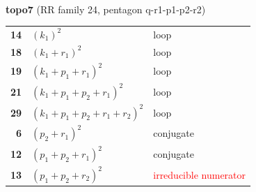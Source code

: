 \documentclass[10pt]{article}
\begin{document}
\begin{minipage}[t]{0.48\textwidth}
{}\\[2mm]\textbf{topo7} (RR family 24, pentagon q-r1-p1-p2-r2)\\[2pt]{\footnotesize\begin{tabular}{@{}r@{\ \ }l@{\ \ }l@{}}\textbf{14} & $(k_1)^2$ & loop\\
\textbf{18} & $(k_1+r_1)^2$ & loop\\
\textbf{19} & $(k_1+p_1+r_1)^2$ & loop\\
\textbf{21} & $(k_1+p_1+p_2+r_1)^2$ & loop\\
\textbf{29} & $(k_1+p_1+p_2+r_1+r_2)^2$ & loop\\
\textbf{6} & $(p_2+r_1)^2$ & conjugate\\
\textbf{12} & $(p_1+p_2+r_1)^2$ & conjugate\\
\textbf{13} & $(p_1+p_2+r_2)^2$ & \textcolor{red}{irreducible numerator}\\\end{tabular}}\end{minipage}\hfill%
\end{document}
